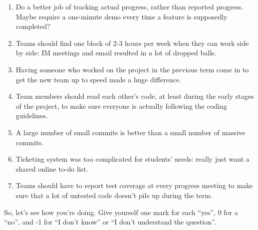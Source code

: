 \documentclass{report}
\begin{document}
\begin{enumerate}

  \item Do a better job of tracking actual progress, rather than
  reported progress.  Maybe require a one-minute demo every time a
  feature is supposedly completed?

  \item Teams should find one block of 2-3 hours per week when they
  can work side by side: IM meetings and email resulted in a lot of
  dropped balls.

  \item Having someone who worked on the project in the previous term
  come in to get the new team up to speed made a huge difference.

  \item Team members should read each other's code, at least during
  the early stages of the project, to make sure everyone is actually
  following the coding guidelines.

  \item A large number of small commits is better than a small number
  of massive commits.

  \item Ticketing system was too complicated for students' needs:
  really just want a shared online to-do list.

  \item Teams should have to report test coverage at every progress
  meeting to make sure that a lot of untested code doesn't pile up
  during the term.

\end{enumerate}


So, let's see how you're doing.  Give yourself one mark for each
``yes'', 0 for a ``no'', and -1 for ``I don't know'' or ``I don't
understand the question''.
\end{document}
